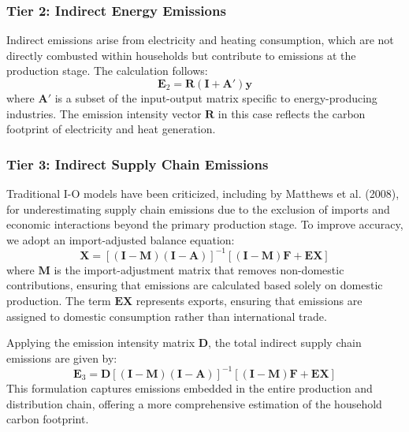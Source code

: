 \documentclass[12pt,a4paper]{article}%
\begin{document}
\subsubsection*{Tier 2: Indirect Energy Emissions}
Indirect emissions arise from electricity and heating consumption, which are not directly combusted within households but contribute to emissions at the production stage. The calculation follows:
\begin{equation}
    \mathbf{E}_2 = \mathbf{R} (\mathbf{I} + \mathbf{A}') \mathbf{y}
\end{equation}
where \( \mathbf{A}' \) is a subset of the input-output matrix specific to energy-producing industries. The emission intensity vector \( \mathbf{R} \) in this case reflects the carbon footprint of electricity and heat generation.

\subsubsection*{Tier 3: Indirect Supply Chain Emissions}
Traditional I-O models have been criticized, including by Matthews et al. (2008), for underestimating supply chain emissions due to the exclusion of imports and economic interactions beyond the primary production stage. To improve accuracy, we adopt an import-adjusted balance equation:
\begin{equation}
    \mathbf{X} = {[(\mathbf{I} - \mathbf{M}) (\mathbf{I} - \mathbf{A})]}^{-1} [(\mathbf{I} - \mathbf{M}) \mathbf{F} + \mathbf{EX}]
\end{equation}
where \( \mathbf{M} \) is the import-adjustment matrix that removes non-domestic contributions, ensuring that emissions are calculated based solely on domestic production. The term \( \mathbf{EX} \) represents exports, ensuring that emissions are assigned to domestic consumption rather than international trade.

Applying the emission intensity matrix \( \mathbf{D} \), the total indirect supply chain emissions are given by:
\begin{equation}
    \mathbf{E}_3 = \mathbf{D} {[(\mathbf{I} - \mathbf{M}) (\mathbf{I} - \mathbf{A})]}^{-1} [(\mathbf{I} - \mathbf{M}) \mathbf{F} + \mathbf{EX}]
\end{equation}
This formulation captures emissions embedded in the entire production and distribution chain, offering a more comprehensive estimation of the household carbon footprint.
\end{document}
